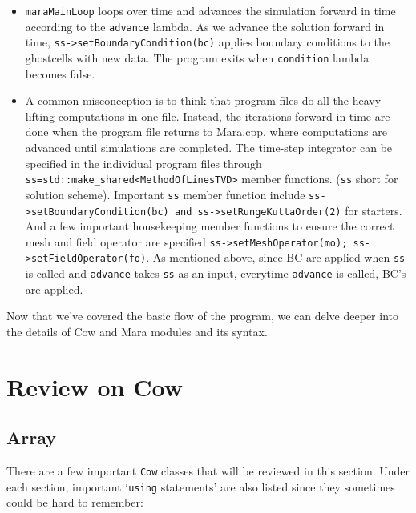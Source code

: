\documentclass{article}
\begin{document}
\begin{itemize}
	\item \texttt{maraMainLoop} loops over time and advances the simulation forward in time according to the \texttt{advance} lambda. As we advance the solution forward in time, \texttt{ss->setBoundaryCondition(bc)} applies boundary conditions to the ghostcells with new data. The program exits when \texttt{condition} lambda becomes false.
	
	\item \underline{A common misconception} is to think that program files do all the heavy-lifting computations in one file. Instead, the iterations forward in time are done when the program file returns to Mara.cpp, where computations are advanced until simulations are completed. The time-step integrator can be specified in the individual program files through \texttt{ss=std::make\_shared<MethodOfLinesTVD>} member functions. (\texttt{ss} short for solution scheme). Important \texttt{ss} member function include \texttt{ss->setBoundaryCondition(bc) and ss->setRungeKuttaOrder(2)} for starters. And a few important housekeeping member functions to ensure the correct mesh and field operator are specified \texttt{ss->setMeshOperator(mo); ss->setFieldOperator(fo)}. As mentioned above, since BC are applied when \texttt{ss} is called and \texttt{advance} takes \texttt{ss} as an input, everytime \texttt{advance} is called, BC's are applied. 

\end{itemize}

Now that we've covered the basic flow of the program, we can delve deeper into the details of Cow and Mara modules and its syntax.

\section{Review on Cow}
\subsection{Array}

There are a few important \texttt{Cow} classes that will be reviewed in this section. Under each section, important `\texttt{using} statements' are also listed since they sometimes could be hard to remember:
\end{document}
